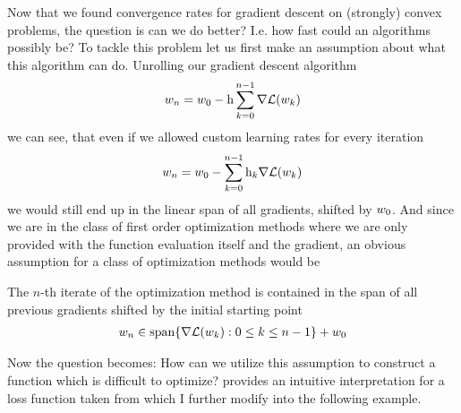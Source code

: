 Now that we found convergence rates for gradient descent on (strongly) convex
problems, the question is can we do better? I.e. how fast could an algorithms
possibly be? To tackle this problem let us first make an assumption about what
this algorithm can do. Unrolling our gradient descent algorithm
%
\begin{align*}
	w_n = w_0 - \text{h}\sum_{k=0}^{n-1} \nabla \mathcal{L}(w_k)
\end{align*}
%
we can see, that even if we allowed custom learning rates for every iteration
%
\begin{align*}
	w_n = w_0 - \sum_{k=0}^{n-1} \text{h}_k \nabla \mathcal{L}(w_k)
\end{align*}
%
we would still end up in the linear span of all gradients, shifted by \(w_0\).
And since we are in the class of first order optimization methods where we are
only provided with the function evaluation itself and the gradient, an obvious
assumption for a class of optimization methods would be
%
\begin{assumption}
	\label{assmpt: parameter in linear hull of gradients}
	The \(n\)-th iterate of the optimization method is contained in the span of all
	previous gradients shifted by the initial starting point
	\begin{align*}
		w_n \in \text{span}\{\nabla \mathcal{L}(w_k) : 0\le k \le n-1\} + w_0
	\end{align*}
\end{assumption}
%
Now the question becomes: How can we utilize this assumption to construct a
function which is difficult to optimize?
\textcite{gohWhyMomentumReally2017} provides an intuitive interpretation for a loss
function taken from \textcite[Section 2.1.2]{nesterovLecturesConvexOptimization2018}
which I further modify into the following example.

